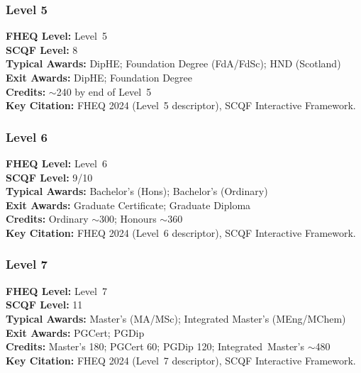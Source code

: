 \subsubsection*{Level 5}

\begin{tcolorbox}
\textbf{FHEQ Level:} Level~5 \\
\textbf{SCQF Level:} 8 \\
\textbf{Typical Awards:} DipHE; Foundation Degree (FdA/FdSc); HND (Scotland) \\
\textbf{Exit Awards:} DipHE; Foundation Degree \\
\textbf{Credits:} $\sim$240 by end of Level~5 \\
\textbf{Key Citation:} FHEQ 2024 (Level~5 descriptor), SCQF Interactive Framework.
\end{tcolorbox}

\subsubsection*{Level 6}

\begin{tcolorbox}
\textbf{FHEQ Level:} Level~6 \\
\textbf{SCQF Level:} 9/10 \\
\textbf{Typical Awards:} Bachelor’s (Hons); Bachelor’s (Ordinary) \\
\textbf{Exit Awards:} Graduate Certificate; Graduate Diploma \\
\textbf{Credits:} Ordinary $\sim$300; Honours $\sim$360 \\
\textbf{Key Citation:} FHEQ 2024 (Level~6 descriptor), SCQF Interactive Framework.
\end{tcolorbox}

\subsubsection*{Level 7}

\begin{tcolorbox}
\textbf{FHEQ Level:} Level~7 \\
\textbf{SCQF Level:} 11 \\
\textbf{Typical Awards:} Master’s (MA/MSc); Integrated Master’s (MEng/MChem) \\
\textbf{Exit Awards:} PGCert; PGDip \\
\textbf{Credits:} Master’s 180; PGCert 60; PGDip 120; Integrated~Master’s $\sim$480 \\
\textbf{Key Citation:} FHEQ 2024 (Level~7 descriptor), SCQF Interactive Framework.
\end{tcolorbox}

